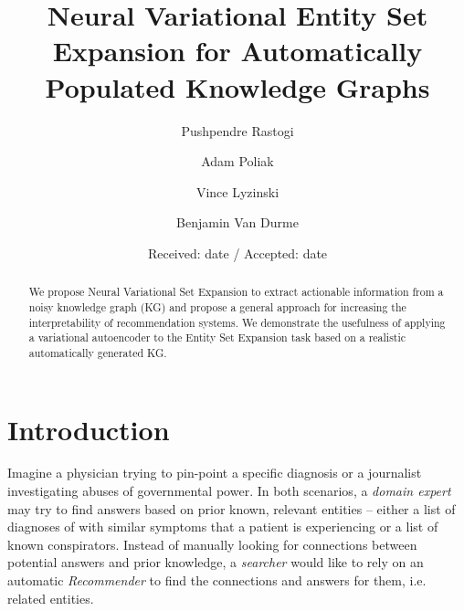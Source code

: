 \documentclass[a4paper]{article}
\title{Neural Variational Entity Set Expansion for Automatically Populated Knowledge Graphs}
\author{Pushpendre Rastogi \and Adam Poliak \and
  Vince Lyzinski \and
  Benjamin Van Durme}
\date{Received: date / Accepted: date} %
\newcommand{\er}{ESE\xspace}
\newcommand{\erLong}{Entity Set Expansion\xspace}
\newcommand{\nvge}{NVSE\xspace}
\newcommand{\nvgeLong}{Neural Variational Set Expansion\xspace}
\begin{document}
\maketitle
\begin{abstract} %
We propose %
\nvgeLong %
to extract actionable information from a noisy
knowledge graph (KG) and
propose a general approach for increasing the
interpretability of recommendation systems. We
demonstrate the usefulness of %
applying a variational autoencoder to the
\erLong task %
based on a realistic
automatically generated KG.
\end{abstract}
\section{Introduction}

Imagine a physician trying to pin-point a specific diagnosis or a journalist %
investigating
abuses of governmental power. %
In both scenarios,
a \textit{domain expert} may try to find answers
based on prior known, relevant entities -- either a list of diagnoses
of with similar symptoms that a patient is experiencing or a list of known conspirators. 
Instead of manually looking for connections between potential answers and prior knowledge, a \textit{searcher}
would like to rely on an automatic \textit{Recommender} to find the connections and answers for them, i.e. related entities.
 
\end{document}
